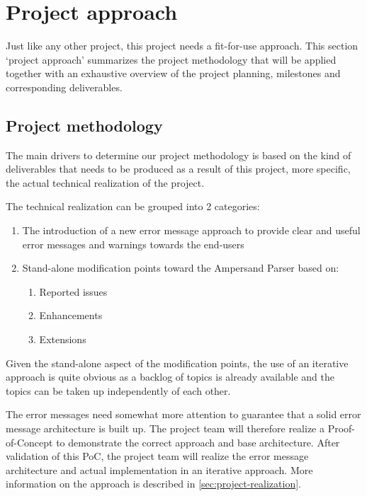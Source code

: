 \section{Project approach}
\label{sec:project-approach}
Just like any other project, this project needs a fit-for-use approach. 
This section `project approach' summarizes the project methodology that will be applied together with an exhaustive overview of the project planning, milestones and corresponding deliverables.

\subsection{Project methodology}
The main drivers to determine our project methodology is based on the kind of deliverables that needs to be produced as a result of this project, more specific, the actual technical realization of the project.

The technical realization can be grouped into 2 categories:
\begin{enumerate}
	\item The introduction of a new error message approach to provide clear and useful error messages and warnings towards the end-users
	\item Stand-alone modification points toward the Ampersand Parser based on:
	\begin{enumerate}
		\item Reported issues
		\item Enhancements
		\item Extensions
	\end {enumerate}
\end {enumerate}

\noindent
Given the stand-alone aspect of the modification points, the use of an iterative approach is quite obvious as a backlog of topics is already available and the topics can be taken up independently of each other. 

%
The error messages need somewhat more attention to guarantee that a solid error message architecture is built up. 
The project team will therefore realize a Proof-of-Concept to demonstrate the correct approach and base architecture. 
After validation of this PoC, the project team will realize the error message architecture and actual implementation in an iterative approach.
More information on the approach is described in \autoref{sec:project-realization}.

